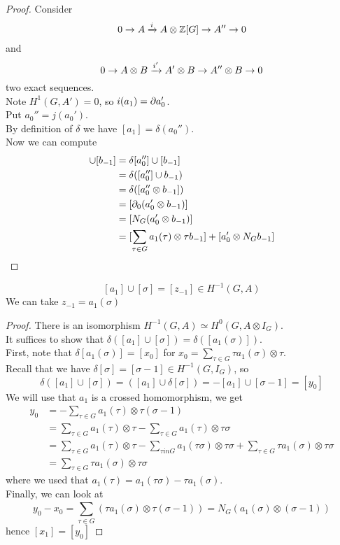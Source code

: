 \documentclass[../main.tex]{subfiles}
\begin{document}
\begin{proof}
Consider
\[ 
0 \to A \xrightarrow{i} A \otimes \mathbb{Z} [ G] \to A'' \to 0
\]
and
\[ 
	0 \to A \otimes B \xrightarrow{i'} A' \otimes B \to A'' \otimes B \to 0
\]
two exact sequences.\\
Note $H^{1}( G, A' ) = 0$, so $i( a_1) = \partial a_0'$.\\
Put $a_0'' = j( a_0') $.\\
By definition of $\delta$ we have $[a_1] = \delta( a_0'') $.\\
Now we can compute
\begin{align*}
[ a_1] \cup [ b_{-1} ] &= \delta [ a_0''] \cup [ b_{-1} ] \\
&= \delta ( [ a_0''] \cup b_{-1} ) \\
&= \delta ( [ a_0'' \otimes b_{-1} ] ) \\
&= [ \del_0 ( a_0' \otimes b_{-1} ) ] \\
&= [ N_G ( a_0' \otimes b_{-1} ) ] \\
&= [ \sum_{\tau \in G} a_1( \tau) \otimes \tau b_{-1} ] + [ a_0' \otimes N_G b_{-1} ] 	
\end{align*}
\end{proof}
\begin{lemma}
\[ 
[ a_1] \cup [ \sigma] = [ z_{-1} ] \in H^{-1}( G,A) 
\]
We can take $z_{-1} = a_1( \sigma) $ 
\end{lemma}
\begin{proof}
There is an isomorphism $H^{-1}( G,A) \simeq H^{0}( G,A\otimes I_G) $.\\
It suffices to show that $\delta( [ a_1] \cup [ \sigma] ) = \delta ( [ a_1( \sigma) ] ) $.\\
First, note that $\delta [ a_1( \sigma) ] = [ x_0] $ for $x_0  = \sum_{\tau \in G} \tau a_1( \sigma) \otimes \tau$.\\
Recall that we have $\delta [ \sigma] = [ \sigma-1] \in H^{-1}( G,I_G ) $, so
\[ 
\delta( [ a_1] \cup [ \sigma] ) = ( [ a_1] \cup \delta [ \sigma] ) = - [ a_1 ] \cup [ \sigma-1] = [ y_0]
\]
We will use that $a_1$ is a crossed homomorphism, we get
\begin{align*}
	y_0 &= - \sum _{\tau \in G} a_1( \tau) \otimes \tau( \sigma-1)\\
	    &= \sum_{\tau \in G} a_1( \tau) \otimes \tau- \sum_{\tau \in G} a_1( \tau) \otimes \tau \sigma\\
	    &= \sum_{\tau \in G} a_1( \tau ) \otimes \tau - \sum_{\tau in G} a_1( \tau\sigma) \otimes\tau\sigma + \sum_{\tau \in G} \tau a_1( \sigma) \otimes \tau\sigma\\
	    &= \sum_{\tau \in G}^{ } \tau a_1( \sigma) \otimes \tau\sigma
\end{align*}
where we used that $a_1( \tau) = a_1( \tau\sigma) - \tau a_1( \sigma) $.\\
Finally, we can look at
\[ 
y_0 - x_0 = \sum_{\tau \in G}^{ } ( \tau a_1( \sigma) \otimes \tau( \sigma-1) ) = N_G( a_1( \sigma) \otimes ( \sigma-1) ) 
\]
hence $[x_1] = [ y_0] $ 
\end{proof}
\end{document}
